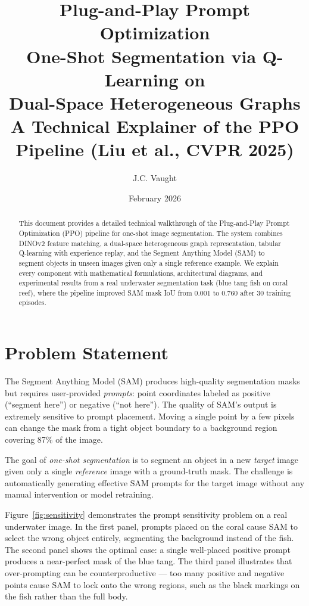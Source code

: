 \documentclass[11pt]{article}
\title{
\textbf{Plug-and-Play Prompt Optimization} \\[0.3em]
\Large One-Shot Segmentation via Q-Learning on \\
Dual-Space Heterogeneous Graphs \\[0.5em]
\normalsize A Technical Explainer of the PPO Pipeline (Liu et al., CVPR 2025)
}
\author{J.C. Vaught}
\date{February 2026}
\begin{document}
\maketitle

\begin{abstract}
This document provides a detailed technical walkthrough of the Plug-and-Play Prompt Optimization (PPO) pipeline for one-shot image segmentation. The system combines DINOv2 feature matching, a dual-space heterogeneous graph representation, tabular Q-learning with experience replay, and the Segment Anything Model (SAM) to segment objects in unseen images given only a single reference example. We explain every component with mathematical formulations, architectural diagrams, and experimental results from a real underwater segmentation task (blue tang fish on coral reef), where the pipeline improved SAM mask IoU from 0.001 to 0.760 after 30 training episodes.
\end{abstract}


\newpage

\section{Problem Statement}

The Segment Anything Model (SAM) produces high-quality segmentation masks but requires user-provided \textit{prompts}: point coordinates labeled as positive (``segment here'') or negative (``not here''). The quality of SAM's output is extremely sensitive to prompt placement. Moving a single point by a few pixels can change the mask from a tight object boundary to a background region covering 87\% of the image.

The goal of \textit{one-shot segmentation} is to segment an object in a new \textit{target} image given only a single \textit{reference} image with a ground-truth mask. The challenge is automatically generating effective SAM prompts for the target image without any manual intervention or model retraining.

Figure~\ref{fig:sensitivity} demonstrates the prompt sensitivity problem on a real underwater image. In the first panel, prompts placed on the coral cause SAM to select the wrong object entirely, segmenting the background instead of the fish. The second panel shows the optimal case: a single well-placed positive prompt produces a near-perfect mask of the blue tang. The third panel illustrates that over-prompting can be counterproductive --- too many positive and negative points cause SAM to lock onto the wrong regions, such as the black markings on the fish rather than the full body.
\end{document}
